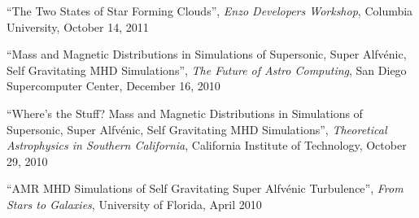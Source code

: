 \medskip
\noindent
``The Two States of Star Forming Clouds'',  {\it Enzo Developers Workshop},
Columbia University, October 14, 2011


\medskip
\noindent
``Mass and Magnetic Distributions in Simulations of
Supersonic, Super Alfv\' enic, Self Gravitating MHD Simulations'',  {\it The
Future of Astro Computing}, 
San Diego Supercomputer Center, December 16, 2010

\medskip
\noindent
``Where's the Stuff? Mass and Magnetic Distributions in Simulations of
Supersonic, Super Alfv\' enic, Self Gravitating MHD Simulations'',  {\it
Theoretical Astrophysics in Southern California}, 
California Institute of Technology, October 29, 2010


\medskip
\noindent
``AMR MHD Simulations of Self Gravitating Super Alfv\' enic Turbulence'',  {\it
From Stars to Galaxies}, University of Florida, April 2010


